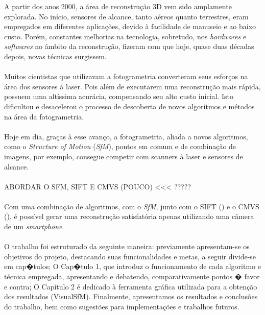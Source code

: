 \documentclass[a4paper,12pt,oneside,onecolumn,final,fleqn]{repUERJ}
\theoremstyle{plain}
\theoremstyle{definition}
\begin{document}
A partir dos anos 2000, a área de reconstrução 3D vem sido amplamente explorada. No início, sensores de alcance, tanto aéreos quanto terrestres, eram empregados em diferentes aplicações, devido à facilidade de manuseio e ao baixo custo. Porém, constantes melhorias na tecnologia, sobretudo, nos {\it hardwares} e {\it softwares} no âmbito da reconstrução, fizeram com que hoje, quase duas décadas depois, novas técnicas surgissem.
\paragraph{}Muitos cientistas que utilizavam a fotogrametria converteram seus esforços na área dos sensores à laser. Pois além de executarem uma reconstrução mais rápida, possuem uma altíssima acurácia, compensando seu alto custo inicial. Isto dificultou e desacelerou o processo de descoberta de novos algoritmos e métodos na área da fotogrametria. 
\paragraph{}Hoje em dia, graças à esse avanço, a fotogrametria, aliada a novos algoritmos, como o  {\it Structure of Motion} ({\it SfM}), pontos em comum e de combinação de imagens, por exemplo, consegue competir com scanners à laser e sensores de alcance. 
\paragraph{} ABORDAR O SFM, SIFT E CMVS (POUCO) <<< ?????
\paragraph{}Com uma combinação de algoritmos, com o {\it SfM}, junto com o SIFT ({\it }) e o CMVS ({\it }), é possível gerar uma reconstrução satisfatória apenas utilizando uma câmera de um {\it smartphone}.
\paragraph{}O trabalho foi estruturado da seguinte maneira: previamente apresentam-se os objetivos do projeto, destacando suas funcionalidades e metas, a seguir divide-se em cap�tulos; O Cap�tulo 1, que introduz o funcionamento de cada algoritmo e técnica empregada, apresentando e debatendo, comparativamente pontos � favor e contra; O Capítulo 2 é dedicado à ferramenta gráfica utilizada para a obtenção dos resultados (VisualSfM). Finalmente, apresentamos os
resultados e conclusões do trabalho, bem como sugestões para implementações e trabalhos futuros.
\end{document}
